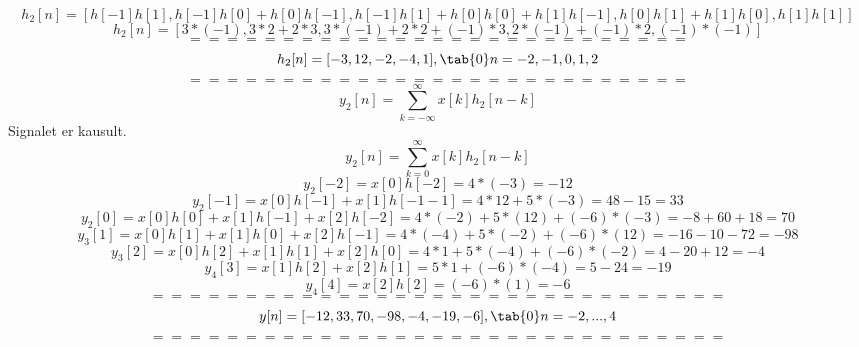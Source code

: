 \begin{rubrik}
\begin{eksamensOpgave}
\begin{UnderOpgave}
            \[h_2[n] = [h[-1]h[1], h[-1]h[0] + h[0]h[-1], h[-1]h[1] + h[0]h[0] + h[1]h[-1], h[0]h[1] + h[1]h[0], h[1]h[1]]\]
            \[h_2[n] = [3 * (-1), 3 * 2 + 2 * 3, 3 * (-1) + 2 * 2 + (-1) * 3, 2 * (-1) + (-1) * 2, (-1)*(-1)]\]
            \[===========================\]
            \[h_2[n] = [-3, 12, -2, -4, 1], \tab{0} n = -2, -1, 0, 1, 2\]
            \[===========================\]
            \[y_2[n] = \sum_{k = -\infty}^{\infty}{x[k]h_2[n - k]}\]
            Signalet er kausult. 
            \[y_2[n] = \sum_{k = 0}^{\infty}{x[k]h_2[n - k]}\]
            \[y_2[-2] = x[0]h[-2] = 4 * (-3) = -12\]
            \[y_2[-1] = x[0]h[-1] + x[1]h[-1-1] = 4 * 12 + 5 * (-3) = 48 - 15 = 33\]
            \[y_2[0] = x[0]h[0] + x[1]h[-1] + x[2]h[-2] = 4 * (-2) + 5 * (12) + (-6)*(-3) = -8 + 60 + 18 = 70\]
            \[y_3[1] = x[0]h[1] + x[1]h[0] + x[2]h[-1] = 4 * (-4) + 5 * (-2) + (-6)*(12) = - 16 - 10 - 72 = -98\]
            \[y_3[2] = x[0]h[2] + x[1]h[1] + x[2]h[0] = 4 * 1 + 5 * (-4) + (-6)*(-2) = 4 - 20 + 12 = -4\]
            \[y_4[3] = x[1]h[2] + x[2]h[1] = 5 * 1 + (-6)*(-4) = 5 - 24 = -19\]
            \[y_4[4] = x[2]h[2] = (-6)*(1) = -6\]
            \[===============================\]
            \[y[n] = [-12, 33, 70, -98, -4, -19, -6], \tab{0} n = -2, ..., 4\]
            \[===============================\]


\end{UnderOpgave}
\end{eksamensOpgave}
\end{rubrik}
